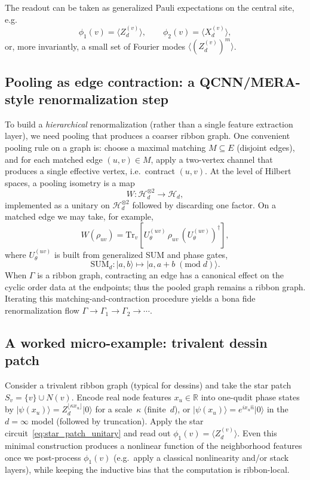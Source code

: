 \documentclass[11pt,oneside]{amsbook}
\numberwithin{equation}{section}
\theoremstyle{plain}
\theoremstyle{definition}
\theoremstyle{remark}
\newcommand{\ket}[1]{\lvert #1 \rangle}
\begin{document}
The readout can be taken as generalized Pauli expectations on the central site, e.g.\
\[
  \phi_1(v)=\langle Z_d^{(v)}\rangle,\qquad
  \phi_2(v)=\langle X_d^{(v)}\rangle,
\]
or, more invariantly, a small set of Fourier modes $\langle (Z_d^{(v)})^m\rangle$.

\subsection{Pooling as edge contraction: a QCNN/MERA-style renormalization step}
To build a \emph{hierarchical} renormalization (rather than a single feature extraction layer),
we need pooling that produces a coarser ribbon graph.
One convenient pooling rule on a graph is:
choose a maximal matching $M\subseteq E$ (disjoint edges), and for each matched edge $(u,v)\in M$,
apply a two-vertex channel that produces a single effective vertex, i.e.\ contract $(u,v)$.
At the level of Hilbert spaces, a pooling isometry is a map
\[
  W:\mathcal{H}_d^{\otimes 2}\to \mathcal{H}_d,
\]
implemented as a unitary on $\mathcal{H}_d^{\otimes 2}$ followed by discarding one factor.
On a matched edge we may take, for example,
\[
  W(\rho_{uv}) = \mathrm{Tr}_{v}\!\left[ U_{\theta}^{(uv)}\,\rho_{uv}\,(U_{\theta}^{(uv)})^\dagger\right],
\]
where $U_{\theta}^{(uv)}$ is built from generalized SUM and phase gates,
\[
  \mathrm{SUM}_d:\ket{a,b}\mapsto \ket{a,a+b\;(\mathrm{mod}\;d)}.
\]
When $\Gamma$ is a ribbon graph, contracting an edge has a canonical effect on the cyclic order
data at the endpoints; thus the pooled graph remains a ribbon graph.
Iterating this matching-and-contraction procedure yields a bona fide renormalization flow
$\Gamma\to \Gamma_1\to \Gamma_2\to \cdots$.

\subsection{A worked micro-example: trivalent dessin patch}
Consider a trivalent ribbon graph (typical for dessins) and take the star patch $S_v=\{v\}\cup N(v)$.
Encode real node features $x_u\in\mathbb{R}$ into one-qudit phase states by
$\ket{\psi(x_u)} = Z_d^{\lfloor \kappa x_u\rfloor}\ket{0}$ for a scale~$\kappa$ (finite~$d$),
or $\ket{\psi(x_u)} = e^{i x_u \hat n}\ket{0}$ in the $d=\infty$ model (followed by truncation).
Apply the star circuit~\eqref{eq:star_patch_unitary} and read out $\phi_1(v)=\langle Z_d^{(v)}\rangle$.
Even this minimal construction produces a nonlinear function of the neighborhood features once
we post-process $\phi_1(v)$ (e.g.\ apply a classical nonlinearity and/or stack layers), while keeping
the inductive bias that the computation is ribbon-local.
\end{document}
